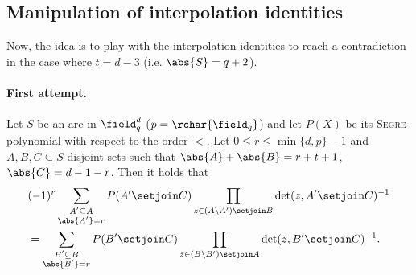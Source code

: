 \message{ !name(OnTheRAIDProblem.tex)}\documentclass[8pt,a4paper]{article}
\begin{document}
\subsection{Manipulation of interpolation identities}

Now, the idea is to play with the interpolation identities to reach a
contradiction in the case where $t= d-3$ (i.e. $\abs{S}=q+2$).

\paragraph{First attempt.}

\begin{lemma}
Let $S$ be an arc in $\field_q^d$ ($p=\rchar{\field_q}$) and let
$P(X)$ be its \textsc{Segre}-polynomial with respect to the order $<$. Let $0\leq
r\leq\min\{d,p\}-1$ and $A,B,C\subseteq S$ disjoint sets such
that $\abs{A}+\abs{B}=r+t+1$, $\abs{C}=d-1-r$. Then it holds that
\begin{align*}
 &(-1)^r\sum_{\substack{A'\subseteq A\\ \abs{A'}=r}}{P(A'\setjoin C)\prod_{z\in (A\setminus A')\setjoin B}{\det(z,A'\setjoin C)^{-1}}}\\
 &= \sum_{\substack{B'\subseteq B\\ \abs{B'}=r}}{P(B'\setjoin C)\prod_{z\in (B\setminus B')\setjoin A}{\det(z,B'\setjoin C)^{-1}}}\text{.}
\end{align*}
\end{lemma}
\end{document}
